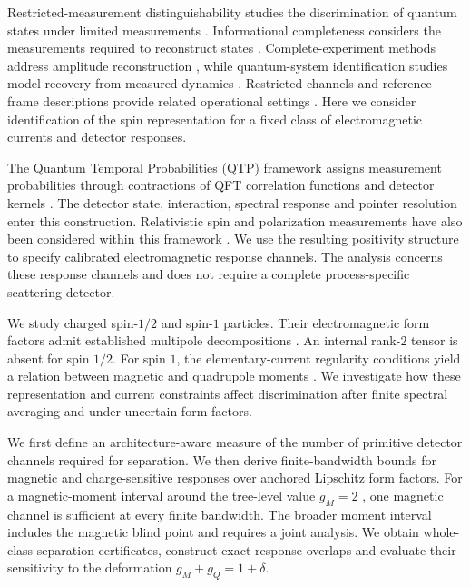 \documentclass[12pt]{iopjournal}
\theoremstyle{definition}
\theoremstyle{remark}
\begin{document}
Restricted-measurement distinguishability studies the discrimination of quantum states under limited measurements \cite{MatthewsWehnerWinter2009}. Informational completeness considers the measurements required to reconstruct states \cite{Finkelstein2004,FlammiaSilberfarbCaves2005,BaldwinDeutschKalev2016}. Complete-experiment methods address amplitude reconstruction \cite{ArenhoevelFix2014,TiatorWorkmanWunderlichHaberzettl2017,KroenertWunderlichAfzalThiel2021}, while quantum-system identification studies model recovery from measured dynamics \cite{BurgarthYuasa2012,BurgarthYuasa2014,LeghtasTuriniciRabitzRouchon2012}. Restricted channels and reference-frame descriptions provide related operational settings \cite{CaretteGlowackiLoveridge2023,SiddiquiWang2026,DuEtAl2026}. Here we consider identification of the spin representation for a fixed class of electromagnetic currents and detector responses.

The Quantum Temporal Probabilities (QTP) framework assigns measurement probabilities through contractions of QFT correlation functions and detector kernels \cite{AnastopoulosSavvidou2015I,AnastopoulosSavvidou2015II,AnastopoulosSavvidou2022}. The detector state, interaction, spectral response and pointer resolution enter this construction. Relativistic spin and polarization measurements have also been considered within this framework \cite{KoliopoulouAnastopoulosSavvidou2026}. We use the resulting positivity structure to specify calibrated electromagnetic response channels. The analysis concerns these response channels and does not require a complete process-specific scattering detector.

We study charged spin-$1/2$ and spin-$1$ particles. Their electromagnetic form factors admit established multipole decompositions \cite{Lorce2009Part1,Lorce2009NaturalMoments,CotognoLorceLowdonMorales2020,CosynVera2025,HuangTanWangYu2026}. An internal rank-$2$ tensor is absent for spin $1/2$. For spin $1$, the elementary-current regularity conditions yield a relation between magnetic and quadrupole moments \cite{Haberzettl2019}. We investigate how these representation and current constraints affect discrimination after finite spectral averaging and under uncertain form factors.

We first define an architecture-aware measure of the number of primitive detector channels required for separation. We then derive finite-bandwidth bounds for magnetic and charge-sensitive responses over anchored Lipschitz form factors. For a magnetic-moment interval around the tree-level value $g_M=2$ \cite{FerraraPorratiTelegdi1992,BrodskyHiller1992,HagiwaraPecceiZeppenfeldHikasa1987}, one magnetic channel is sufficient at every finite bandwidth. The broader moment interval includes the magnetic blind point and requires a joint analysis. We obtain whole-class separation certificates, construct exact response overlaps and evaluate their sensitivity to the deformation $g_M+g_Q=1+\delta$.
\end{document}
